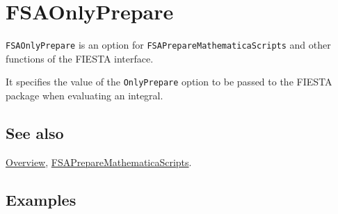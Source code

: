 \documentclass[../FeynHelpersManual.tex]{subfiles}
\begin{document}
\hypertarget{fsaonlyprepare}{
\section{FSAOnlyPrepare}\label{fsaonlyprepare}}

\texttt{FSAOnlyPrepare} is an option for
\texttt{FSAPrepareMathematicaScripts} and other functions of the FIESTA
interface.

It specifies the value of the \texttt{OnlyPrepare} option to be passed
to the FIESTA package when evaluating an integral.

\subsection{See also}

\hyperlink{toc}{Overview},
\hyperlink{fsapreparemathematicascripts}{FSAPrepareMathematicaScripts}.

\subsection{Examples}
\end{document}
